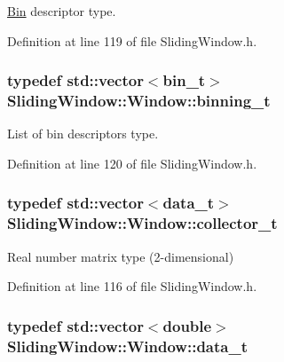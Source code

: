 \hyperlink{classSlidingWindow_1_1Bin}{Bin} descriptor type. 



Definition at line 119 of file Sliding\+Window.\+h.

\subsubsection[{\texorpdfstring{binning\+\_\+t}{binning_t}}]{\setlength{\rightskip}{0pt plus 5cm}typedef std\+::vector$<${\bf bin\+\_\+t}$>$ {\bf Sliding\+Window\+::\+Window\+::binning\+\_\+t}}\hypertarget{classSlidingWindow_1_1Window_a71c711c04a16a1f32a9731f80e73b5e8}{}\label{classSlidingWindow_1_1Window_a71c711c04a16a1f32a9731f80e73b5e8}


List of bin descriptors type. 



Definition at line 120 of file Sliding\+Window.\+h.

\subsubsection[{\texorpdfstring{collector\+\_\+t}{collector_t}}]{\setlength{\rightskip}{0pt plus 5cm}typedef std\+::vector$<${\bf data\+\_\+t}$>$ {\bf Sliding\+Window\+::\+Window\+::collector\+\_\+t}}\hypertarget{classSlidingWindow_1_1Window_a86da88957da29f042341ff4b0413316e}{}\label{classSlidingWindow_1_1Window_a86da88957da29f042341ff4b0413316e}


Real number matrix type (2-\/dimensional) 



Definition at line 116 of file Sliding\+Window.\+h.

\subsubsection[{\texorpdfstring{data\+\_\+t}{data_t}}]{\setlength{\rightskip}{0pt plus 5cm}typedef std\+::vector$<$double$>$ {\bf Sliding\+Window\+::\+Window\+::data\+\_\+t}}\hypertarget{classSlidingWindow_1_1Window_abc07b028eea17a8713e74a556b9d1ad2}{}\label{classSlidingWindow_1_1Window_abc07b028eea17a8713e74a556b9d1ad2}


